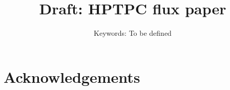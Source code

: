 \documentclass[11pt,a4paper]{article}
\title{Draft: HPTPC flux paper}
\date{Keywords: To be defined}
\begin{document}
\maketitle
\begin{abstract}

\end{abstract}



\linenumbers











\newenvironment{acknowledgement}{\relax}{\relax}
\begin{acknowledgement}
\section*{Acknowledgements}

\end{acknowledgement}


\AtNextBibliography{\small}
\printbibliography[heading=bibintoc]
\end{document}
